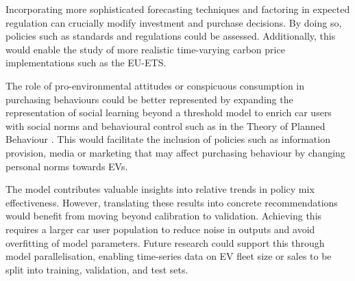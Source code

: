 \documentclass[12pt]{article}
\begin{document}
    Incorporating more sophisticated forecasting techniques and factoring in expected regulation can crucially modify investment and purchase decisions. By doing so, policies such as standards and regulations could be assessed. Additionally, this would enable the study of more realistic time-varying carbon price implementations such as the EU-ETS.
    
    The role of pro-environmental attitudes or conspicuous consumption in purchasing behaviours could be better represented by expanding the representation of social learning beyond a threshold model to enrich car users with social norms and behavioural control such as in the Theory of Planned Behaviour \citep{ajzen1991theory}. This would facilitate the inclusion of policies such as information provision, media \citep{eppstein2011agent} or marketing that may affect purchasing behaviour by changing personal norms towards EVs. 
    
    The model contributes valuable insights into relative trends in policy mix effectiveness. However, translating these results into concrete recommendations would benefit from moving beyond calibration to validation. Achieving this requires a larger car user population to reduce noise in outputs and avoid overfitting of model parameters. Future research could support this through model parallelisation, enabling time-series data on EV fleet size or sales to be split into training, validation, and test sets.
    
    

		

    
	
\end{document}
